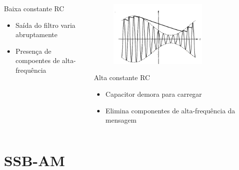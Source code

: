 \documentclass[10pt,hyperref={pdfpagemode=FullScreen},aspectratio=169]{beamer}
\begin{document}
\begin{frame}
\begin{columns}[T]
\begin{column}{0.45\textwidth}
        \begin{block}{Baixa constante RC}
          \begin{itemize}
            \item Saída do filtro varia abruptamente
            \item Presença de compoentes de alta-frequência
          \end{itemize}
        \end{block}        
  \end{column}
  \begin{column}{0.45\textwidth}
    \begin{figure}[!t]
      \begin{center}
        \includegraphics[width= 0.75\textwidth]{Fig/demod_am_conv_alto_rc.png}  
      \end{center}
    \end{figure}
    \begin{block}{Alta constante RC}
          \begin{itemize}
            \item Capacitor demora para carregar
            \item Elimina componentes de alta-frequência da mensagem
          \end{itemize}
    \end{block}        
  \end{column}
\end{columns}
\end{frame}


\section{SSB-AM}
\end{document}
